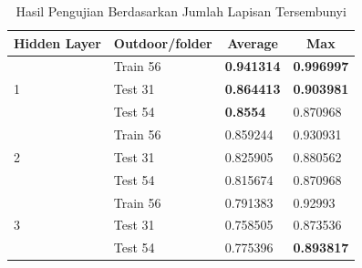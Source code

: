 \begin{table}[H]
\centering
\caption{Hasil Pengujian Berdasarkan Jumlah Lapisan Tersembunyi}
\label{tbl:TestHiddenLayer}
\begin{small}
\begin{tabular}{|l|l|l|l|}
\hline
\multicolumn{1}{|c|}{\textbf{Hidden Layer}} & \multicolumn{1}{c|}{\textbf{Outdoor/folder}} & \multicolumn{1}{c|}{\textbf{Average}} & \multicolumn{1}{c|}{\textbf{Max}} \\ \hline
\multirow{3}{*}{1}                          & Train 56                                     & \textbf{0.941314}                     & \textbf{0.996997}                 \\ \cline{2-4} 
                                            & Test 31                                      & \textbf{0.864413}                     & \textbf{0.903981}                 \\ \cline{2-4} 
                                            & Test 54                                      & \textbf{0.8554}                       & 0.870968                          \\ \hline
\multirow{3}{*}{2}                          & Train 56                                     & 0.859244                              & 0.930931                          \\ \cline{2-4} 
                                            & Test 31                                      & 0.825905                              & 0.880562                          \\ \cline{2-4} 
                                            & Test 54                                      & 0.815674                              & 0.870968                          \\ \hline
\multirow{3}{*}{3}                          & Train 56                                     & 0.791383                              & 0.92993                           \\ \cline{2-4} 
                                            & Test 31                                      & 0.758505                              & 0.873536                          \\ \cline{2-4} 
                                            & Test 54                                      & 0.775396                              & \textbf{0.893817}                 \\ \hline
\end{tabular}
\end{small}
\end{table}

